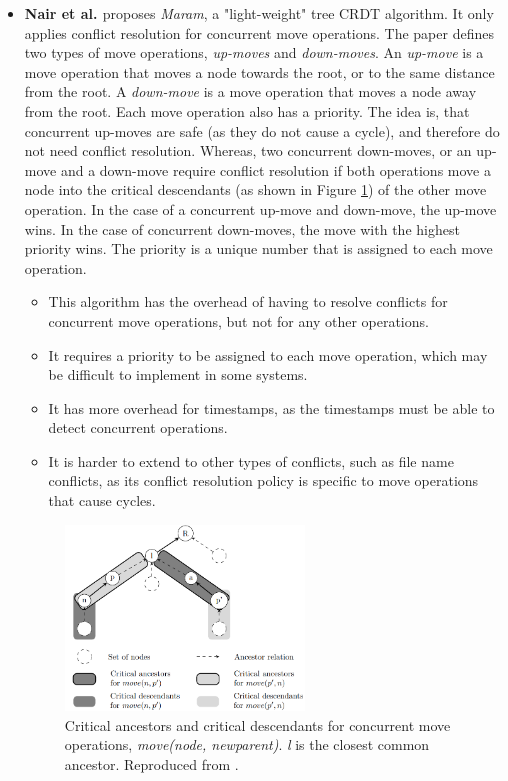 \documentclass[12pt]{report}
\begin{document}
\begin{itemize}
    \item
          \textbf{Nair et al. \cite{https://doi.org/10.48550/arxiv.2103.04828}} proposes \textit{Maram}, a "light-weight" tree CRDT algorithm. It only applies conflict resolution for concurrent move operations. The paper defines two types of move operations, \textit{up-moves} and \textit{down-moves}. An \textit{up-move} is a move operation that moves a node towards the root, or to the same distance from the root. A \textit{down-move} is a move operation that moves a node away from the root. Each move operation also has a priority. The idea is, that concurrent up-moves are safe (as they do not cause a cycle), and therefore do not need conflict resolution. Whereas, two concurrent down-moves, or an up-move and a down-move require conflict resolution if both operations move a node into the critical descendants (as shown in Figure \ref{fig:maram}) of the other move operation. In the case of a concurrent up-move and down-move, the up-move wins. In the case of concurrent down-moves, the move with the highest priority wins. The priority is a unique number that is assigned to each move operation.
          \begin{itemize}
            \item This algorithm has the overhead of having to resolve conflicts for concurrent move operations, but not for any other operations. \par
            \item It requires a priority to be assigned to each move operation, which may be difficult to implement in some systems. \par
            \item It has more overhead for timestamps, as the timestamps must be able to detect concurrent operations. \par
            \item It is harder to extend to other types of conflicts, such as file name conflicts, as its conflict resolution policy is specific to move operations that cause cycles. \par
          \end{itemize}
          

\begin{figure}[H]
    \centering
    \includegraphics[width=0.6\textwidth]{images/maram.png}
    \caption{Critical ancestors and critical descendants for concurrent move operations, \textit{move(node, newparent)}. \textit{l} is the closest common ancestor. Reproduced from \cite{https://doi.org/10.48550/arxiv.2103.04828}.}
    \label{fig:maram}
\end{figure}


\end{itemize}
\end{document}
